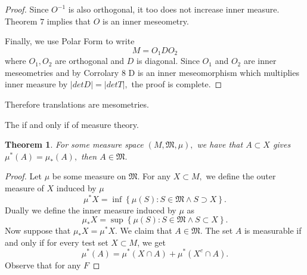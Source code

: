 \documentclass[letter]{article}
\newtheorem{theorem}{Theorem}
\newenvironment{menumerate}{%
  \edef\backupindent{\the\parindent}%
  \enumerate%
  \setlength{\parindent}{\backupindent}%
}{\endenumerate}
\begin{document}
\begin{menumerate}
\begin{proof}
		Since $O^{-1}$ is also orthogonal, it too does not increase inner measure. Theorem $7$ implies that $O$ is an inner meseometry.

		Finally, we use Polar Form to write
		\begin{equation}
			M = O_1 D O_2
		\end{equation}
		where $O_1, O_2$ are orthogonal and $D$ is diagonal. Since $O_1$ and $O_2$ are inner meseometries and by Corrolary $8$ D is an inner meseomorphism which multiplies inner measure by $|det D| =|det T|,$ the proof is complete. 
	\end{proof}
	Therefore translations are mesometries.

	\setcounter{enumi}{8}
	\item The if and only if of measure theory.
	\begin{theorem}
		For some measure space $(M, \mathfrak{M}, \mu),$ we have that $A \subset X$ gives $\mu^*(A) = \mu_*(A),$ then $A \in \mathfrak{M}.$
	\end{theorem}
	\begin{proof}
		Let $\mu$ be some measure on $\mathfrak{M}.$ For any $X \subset M,$ we define
		the outer measure of $X$ induced by $\mu$
		\begin{equation}
			\mu^*X = \inf\left\{\mu(S): S \in \mathfrak{M} \wedge S \supset X\right\}.
		\end{equation}
		Dually we define the inner measure induced by $\mu$ as
		\begin{equation}
				\mu_*X = \sup\left\{\mu(S): S \in \mathfrak{M} \wedge S \subset X\right\}.
		\end{equation}
		Now suppose that $\mu_*X = \mu^*X.$ We claim that $A \in \mathfrak{M}.$ 
		The set $A$ is measurable if and only if for every test set $X \subset M$,
		we get
		\begin{equation}
			\mu^*(A) = \mu^*(X \cap A) + \mu^*(X^c \cap A).
		\end{equation}
		Observe that for any $F$
	\end{proof}
\end{menumerate} 
\end{document}
